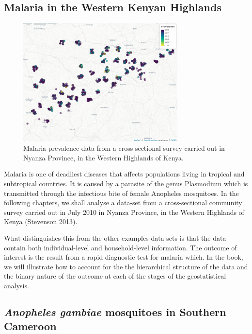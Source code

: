 \documentclass[
  letterpaper,
]{krantz}
\begin{document}
\hypertarget{sec-malaria-ch1}{%
\subsection{Malaria in the Western Kenyan
Highlands}\label{sec-malaria-ch1}}

\begin{figure}

{\centering \includegraphics[width=3.31in,height=\textheight]{./figures/malkenya_ch1.png}

}

\caption{\label{fig-malkenya-ch1}Malaria prevalence data from a
cross-sectional survey carried out in Nyanza Province, in the Western
Highlands of Kenya.}

\end{figure}

Malaria is one of deadliest diseases that affects populations living in
tropical and subtropical countries. It is caused by a parasite of the
genus Plasmodium which is transmitted through the infectious bite of
female Anopheles mosquitoes. In the following chapters, we shall analyse
a data-set from a cross-sectional community survey carried out in July
2010 in Nyanza Province, in the Western Highlands of Kenya (Stevenson
2013).

What distinguishes this from the other examples data-sets is that the
data contain both individual-level and household-level information. The
outcome of interest is the result from a rapid diagnostic test for
malaria which. In the book, we will illustrate how to account for the
the hierarchical structure of the data and the binary nature of the
outcome at each of the stages of the geostatistical analysis.

\hypertarget{sec-mosq-data-ch1}{%
\subsection{\texorpdfstring{\emph{Anopheles gambiae} mosquitoes in
Southern
Cameroon}{Anopheles gambiae mosquitoes in Southern Cameroon}}\label{sec-mosq-data-ch1}}
\end{document}
